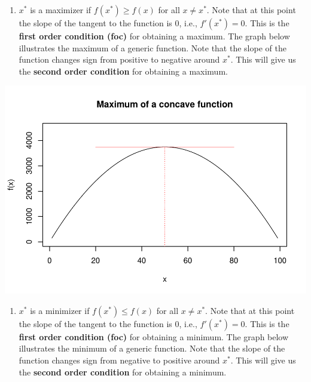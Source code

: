 \documentclass[]{book}
\providecommand{\tightlist}{%
  \setlength{\itemsep}{0pt}\setlength{\parskip}{0pt}}
\theoremstyle{definition}
\theoremstyle{definition}
\theoremstyle{definition}
\theoremstyle{remark}
\begin{document}
\begin{enumerate}
\def\labelenumi{\arabic{enumi}.}
\tightlist
\item
  \(x^*\) is a maximizer if \(f(x^*)\geq f(x)\) for all \(x\neq x^*\). Note that at this point the slope of the tangent to the function is \(0\), i.e., \(f'(x^*)=0\). This is the \textbf{first order condition (foc)} for obtaining a maximum. The graph below illustrates the maximum of a generic function. Note that the slope of the function changes sign from positive to negative around \(x^*\). This will give us the \textbf{second order condition} for obtaining a maximum.
\end{enumerate}

\includegraphics{bookdown-demo_files/figure-latex/unnamed-chunk-25-1.pdf}

\begin{enumerate}
\def\labelenumi{\arabic{enumi}.}
\setcounter{enumi}{1}
\tightlist
\item
  \(x^*\) is a minimizer if \(f(x^*)\leq f(x)\) for all \(x\neq x^*\). Note that at this point the slope of the tangent to the function is \(0\), i.e., \(f'(x^*)=0\). This is the \textbf{first order condition (foc)} for obtaining a minimum. The graph below illustrates the minimum of a generic function. Note that the slope of the function changes sign from negative to positive around \(x^*\). This will give us the \textbf{second order condition} for obtaining a minimum.
\end{enumerate}
\end{document}
